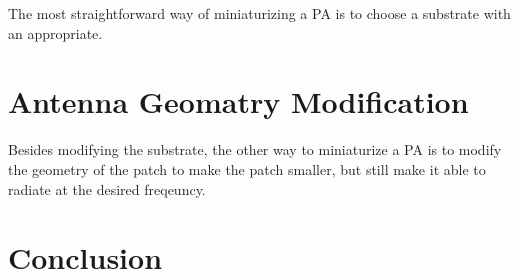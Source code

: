 \documentclass[12pt]{article}
\begin{document}
The most straightforward way of miniaturizing a PA is to choose a substrate with an appropriate.

\section{Antenna Geomatry Modification}

Besides modifying the substrate, the other way to miniaturize a PA is to modify the geometry of the patch to make the patch smaller, but still make it able to radiate at the desired freqeuncy.

\section{Conclusion}

\newpage


\end{document}
